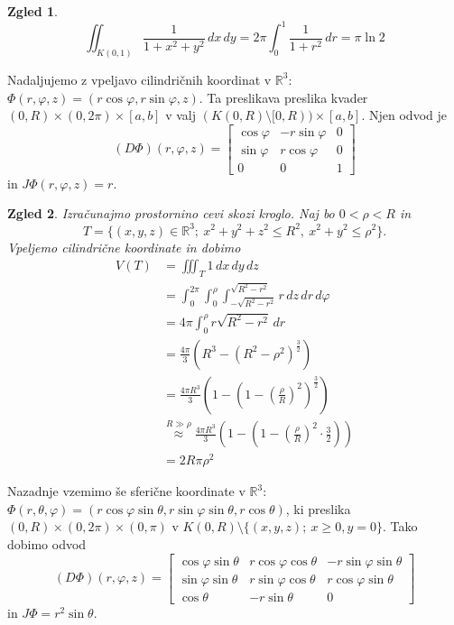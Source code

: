 \documentclass[10pt, a4paper]{article}
\newtheorem{zgled}{Zgled}[section]
\newcommand{\R}{\mathbb {R}}
\begin{document}
\begin{zgled}
    $$\iint_{K(0, 1)} \frac{1}{1 + x^2 + y^2}\, dx\, dy = 2 \pi \int_0 ^1 \frac{1}{1 + r^2}\, dr = \pi \ln 2$$
\end{zgled}

Nadaljujemo z vpeljavo cilindričnih koordinat v $\R^3$: $\Phi (r, \varphi, z) = (r \cos \varphi, r \sin \varphi, z).$
Ta preslikava preslika kvader $(0, R) \times (0, 2 \pi) \times [a, b]$ v valj 
$(K(0, R) \setminus [0, R))\times [a, b]$.
Njen odvod je 
$$(D\Phi)(r, \varphi, z) = \begin{bmatrix}
    \cos \varphi & -r \sin \varphi & 0\\
    \sin \varphi & r \cos \varphi & 0\\
    0 & 0 & 1
\end{bmatrix}$$ in $J \Phi(r, \varphi, z) = r$.

\begin{zgled}
    Izračunajmo prostornino cevi skozi kroglo.
    Naj bo $0 < \rho < R$ in $$T  = \{(x, y, z) \in \R^3;\ x^2 + y^2 + z^2 \leq R^2,\ x^2 + y^2 \leq \rho^2\}.$$
    Vpeljemo cilindrične koordinate in dobimo 
    \begin{align*}
        V(T) &= \iiint_T 1\, dx\, dy\, dz\\
        &= \int_0 ^{2 \pi} \int_0 ^\rho \int_{-\sqrt{R^2 - r^2}} ^{\sqrt{R^2 - r^2}} r\, dz\, dr\, d\varphi\\
        &= 4\pi\int_0 ^\rho r \sqrt{R^2 - r^2}\, dr\\
        &= \frac{4 \pi}{3} \left(R^3 - (R^2 - \rho^2)^{\frac{3}{2}}\right)\\
        &= \frac{4 \pi R^3}{3} \left(1 - \left(1 - \left(\frac{\rho}{R}\right)^2\right)^\frac{3}{2}\right)\\
        &\stackrel{R \gg \rho}{\approx} \frac{4 \pi R^3}{3} \left(1 - \left(1 - \left(\frac{\rho}{R}\right)^2 \cdot \frac{3}{2}\right)\right)\\
        &= 2R \pi \rho^2
    \end{align*}
\end{zgled}

Nazadnje vzemimo še sferične koordinate v $\R^3$:
$\Phi (r, \theta, \varphi) = (r \cos \varphi \sin \theta, r \sin \varphi \sin \theta, r \cos \theta)$,
ki preslika $(0,R) \times (0, 2\pi) \times (0, \pi)$ v $K(0, R) \setminus \{(x, y, z);\ x \geq 0, y = 0\}$.
Tako dobimo odvod 
$$(D\Phi)(r, \varphi, z) = \begin{bmatrix}
    \cos \varphi \sin \theta & r \cos \varphi \cos \theta & -r \sin \varphi \sin \theta\\
    \sin \varphi \sin \theta & r \sin \varphi \cos \theta & r \cos \varphi \sin \theta\\
    \cos \theta & - r \sin \theta & 0
\end{bmatrix}$$ 
in $J \Phi = r^2 \sin \theta.$
\end{document}

